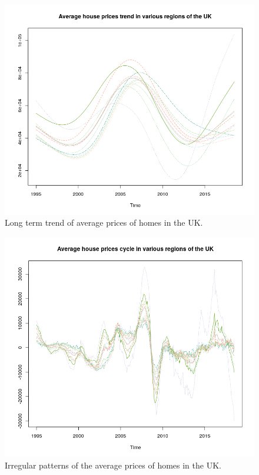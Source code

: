 \documentclass[letterpaper]{scrartcl}
\begin{document}
        \begin{figure}[H]
            \centering
            \includegraphics[scale = 0.6]{HPFilterDataTrendNoCycle.png}
            \caption{Long term trend of average prices of homes in the UK.}
            \label{fig:my_label}
        \end{figure}        
    
        \begin{figure}[H]
            \centering
            \includegraphics[scale = 0.6]{HPFilterDataNoTrendCycle.png}
            \caption{Irregular patterns of the average prices of homes in the UK.}
            \label{fig:my_label}
        \end{figure}        
\end{document}
